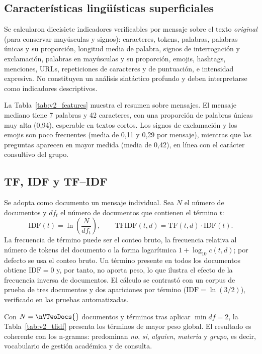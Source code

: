 

\subsection{Características lingüísticas superficiales}

Se calcularon diecisiete indicadores verificables por mensaje sobre el texto
\emph{original} (para conservar mayúsculas y signos): caracteres, tokens, palabras,
palabras únicas y su proporción, longitud media de palabra, signos de interrogación y
exclamación, palabras en mayúsculas y su proporción, emojis, hashtags, menciones, URLs,
repeticiones de caracteres y de puntuación, e intensidad expresiva. No constituyen un
análisis sintáctico profundo y deben interpretarse como indicadores descriptivos.

La Tabla~\ref{tab:v2_features} muestra el resumen sobre \nVTwoMensajes{} mensajes. El
mensaje mediano tiene 7 palabras y 42 caracteres, con una proporción de palabras únicas
muy alta (0,94), esperable en textos cortos. Los signos de exclamación y los emojis son
poco frecuentes (media de 0,11 y 0,29 por mensaje), mientras que las preguntas aparecen
en mayor medida (media de 0,42), en línea con el carácter consultivo del grupo.



\subsection{TF, IDF y TF--IDF}

Se adopta como documento un mensaje individual. Sea $N$ el número de documentos y
$df_t$ el número de documentos que contienen el término $t$:
\begin{equation}
  \mathrm{IDF}(t) = \ln\!\left(\frac{N}{df_t}\right), \qquad
  \mathrm{TFIDF}(t,d) = \mathrm{TF}(t,d)\cdot \mathrm{IDF}(t).
\end{equation}
La frecuencia de término puede ser el conteo bruto, la frecuencia relativa al número de
tokens del documento o la forma logarítmica $1+\log_{10} c(t,d)$; por defecto se usa el
conteo bruto. Un término presente en todos los documentos obtiene
$\mathrm{IDF}=0$ y, por tanto, no aporta peso, lo que ilustra el efecto de la frecuencia
inversa de documentos. El cálculo se contrastó con un corpus de prueba de tres documentos
y dos apariciones por término ($\mathrm{IDF}=\ln(3/2)$), verificado en las pruebas
automatizadas.

Con $N=\nVTwoDocs{}$ documentos y \nVTwoTerms{} términos tras aplicar
$\min df=2$, la Tabla~\ref{tab:v2_tfidf} presenta los términos de mayor peso global. El
resultado es coherente con los n-gramas: predominan \emph{no}, \emph{si}, \emph{alguien},
\emph{materia} y \emph{grupo}, es decir, vocabulario de gestión académica y de consulta.

